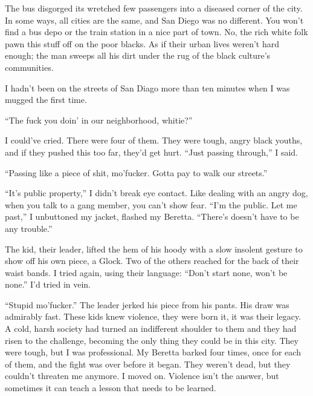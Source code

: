The bus disgorged its wretched few passengers into a diseased
corner of the city. In some ways, all cities are the same, and San
Diego was no different. You won't find a bus depo or the
train station in a nice part of town. No, the rich white folk pawn
this stuff off on the poor blacks. As if their urban lives
weren't hard enough; the man sweeps all his dirt under the
rug of the black culture's communities.



I hadn't been on the streets of San Diago more than ten
minutes when I was mugged the first time.



``The fuck you doin' in our neighborhood,
whitie?''



I could've cried. There were four of them. They were tough,
angry black youths, and if they pushed this too far, they'd
get hurt. ``Just passing through,'' I said.



``Passing like a piece of shit, mo'fucker. Gotta pay to
walk our streets.''



``It's public property,'' I didn't break eye
contact. Like dealing with an angry dog, when you talk to a gang
member, you can't show fear. ``I'm the public. Let
me past,'' I unbuttoned my jacket, flashed my Beretta.
``There's doesn't have to be any
trouble.''



The kid, their leader, lifted the hem of his hoody with a slow
insolent gesture to show off his own piece, a Glock. Two of the
others reached for the back of their waist bands. I tried again,
using their language: ``Don't start none, won't be
none.'' I'd tried in vein.



``Stupid mo'fucker.'' The leader jerked his piece
from his pants. His draw was admirably fast. These kids knew
violence, they were born it, it was their legacy. A cold, harsh
society had turned an indifferent shoulder to them and they had
risen to the challenge, becoming the only thing they could be in
this city. They were tough, but I was professional. My Beretta
barked four times, once for each of them, and the fight was over
before it began. They weren't dead, but they couldn't
threaten me anymore. I moved on. Violence isn't the answer,
but sometimes it can teach a lesson that needs to be learned.



